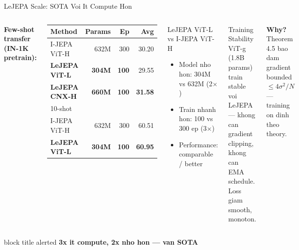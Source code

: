 \documentclass[aspectratio=169,12pt]{beamer}
\newcommand{\takeaway}[1]{%
  \vfill
  \begin{beamercolorbox}[sep=4pt,center,rounded=true]{block title alerted}
    \small\bfseries #1
  \end{beamercolorbox}
}
\newcommand{\good}[1]{\textcolor{good}{#1}}
\begin{document}
\begin{frame}{LeJEPA Scale: SOTA Voi It Compute Hon}
\begin{columns}[c]
\textbf{Few-shot transfer (IN-1K pretrain):}
\begin{center}
\begin{tabular}{lrrr}
\toprule
Method & Params & Ep & Avg \\
\midrule
I-JEPA ViT-H & 632M & 300 & 30.20 \\
\textbf{LeJEPA ViT-L} & \textbf{304M} & \textbf{100} & 29.55 \\
\textbf{LeJEPA CNX-H} & \textbf{660M} & \textbf{100} & \textbf{31.58} \\
\midrule
\multicolumn{4}{l}{\footnotesize 10-shot} \\
I-JEPA ViT-H & 632M & 300 & 60.51 \\
\textbf{LeJEPA ViT-L} & \textbf{304M} & \textbf{100} & \textbf{60.95} \\
\bottomrule
\end{tabular}
\end{center}
\vspace{6pt}

\begin{block}{LeJEPA ViT-L vs I-JEPA ViT-H}
\begin{itemize}\small
  \item Model nho hon: \good{304M vs 632M} (2$\times$)
  \item Train nhanh hon: \good{100 vs 300 ep} (3$\times$)
  \item Performance: \good{comparable / better}
\end{itemize}
\end{block}
\vspace{8pt}
\begin{exampleblock}{Training Stability}
\small ViT-g (1.8B params) train stable voi LeJEPA --- khong can gradient clipping, khong can EMA schedule.\\
Loss giam smooth, monoton.
\end{exampleblock}
\vspace{6pt}
\textbf{Why?} Theorem 4.5 bao dam gradient bounded $\leq 4\sigma^2/N$ --- training on dinh theo theory.
\end{columns}
\takeaway{3x it compute, 2x nho hon --- van SOTA}
\end{frame}
\end{document}
